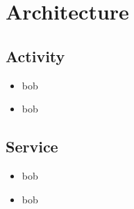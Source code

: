 \section{Architecture}
\subsection{Activity}

		\begin{frame}{}
		\begin{itemize}
		\item bob
		\end{itemize}
		\end{frame}

		\begin{frame}{}
		\begin{itemize}
		\item bob
		\end{itemize}
		\end{frame}

\subsection{Service}
		\begin{frame}{}
		\begin{itemize}
		\item bob
		\end{itemize}
		\end{frame}
		
		\begin{frame}{}
		\begin{itemize}
		\item bob
		\end{itemize}
		\end{frame}

